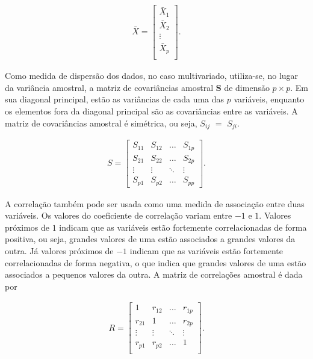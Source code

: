 \documentclass[12pt,a4paper]{article}
\begin{document}
\begin{align*}
	\bar{X} = \left[
	\begin{array}{c}
    	\bar{X}_1\\
	    \bar{X}_2\\
	    \vdots\\
	    \bar{X}_p\\
    \end{array}
	\right].
\end{align*}
	
Como medida de dispersão dos dados, no caso multivariado, utiliza-se, no lugar da variância amostral, a matriz de covariâncias amostral $\boldsymbol{S}$ de dimensão $p \times p$. Em sua diagonal principal, estão as variâncias de cada uma das $p$ variáveis, enquanto os elementos fora da diagonal principal são as covariâncias entre as variáveis. A matriz de covariâncias amostral é simétrica, ou seja,  $S_{ij}$ $=$ $S_{ji}$.
	
	
\begin{align*}
	S =
	\left[
	\begin{array}{cccc}
    	S_{11} & S_{12} & \dots & S_{1p} \\
	    S_{21} & S_{22} & \dots & S_{2p} \\
	    \vdots & \vdots & \ddots & \vdots \\
	    S_{p1} & S_{p2} & \dots & S_{pp} 
	\end{array}
	\right].
\end{align*}        
	
A correlação também pode ser usada como uma medida de associação entre duas variáveis. Os valores do coeficiente de correlação variam entre $-1$ e $1$. Valores próximos de $1$ indicam que as variáveis estão fortemente correlacionadas de forma positiva, ou seja, grandes valores de uma estão associados a grandes valores da outra. Já valores próximos de $-1$ indicam que as variáveis estão fortemente correlacionadas de forma negativa, o que indica que grandes valores de uma estão associados a pequenos valores da outra. A matriz de correlações amostral é dada por 
	
\begin{align}
	R =
	\left[
	\begin{array}{cccc}
    	1      & r_{12} & \dots  & r_{1p} \\
	    r_{21} & 1 & \dots  & r_{2p} \\
	    \vdots & \vdots & \ddots & \vdots \\
	    r_{p1} & r_{p2} & \dots  & 1\\
	\end{array}
	\right].
	\label{def_matriz_corr_2}
\end{align}        
	
\end{document}
